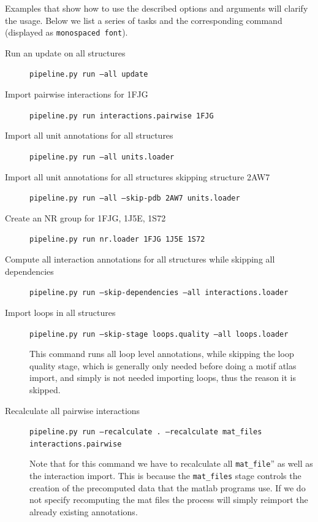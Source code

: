 Examples that show how to use the described options and arguments will clarify
the usage. Below we list a series of tasks and the corresponding command
(displayed as {\tt monospaced font}).

\begin{description}
        \item [Run an update on all structures]
                {\tt pipeline.py run --all update}

        \item [Import pairwise interactions for 1FJG]
                {\tt pipeline.py run interactions.pairwise 1FJG}

        \item [Import all unit annotations for all structures]
                {\tt pipeline.py run --all units.loader}

        \item [Import all unit annotations for all structures skipping structure 2AW7]
                {\tt pipeline.py run --all --skip-pdb 2AW7 units.loader}

        \item [Create an NR group for 1FJG, 1J5E, 1S72]
                {\tt pipeline.py run nr.loader 1FJG 1J5E 1S72}

        \item [Compute all interaction annotations for all structures while skipping all dependencies]
                {\tt pipeline.py run --skip-dependencies --all interactions.loader}

        \item [Import loops in all structures]
                {\tt pipeline.py run --skip-stage loops.quality --all loops.loader}

                This command runs all loop level annotations, while skipping the loop quality stage,
                which is generally only needed before doing a motif atlas import, and simply is not
                needed importing loops, thus the reason it is skipped.

        \item [Recalculate all pairwise interactions]
                {\tt pipeline.py run --recalculate . --recalculate mat\_files interactions.pairwise}

                Note that for this command we have to recalculate all
                {\tt mat\_file}'' as well as the interaction import. This is
                because the {\tt mat\_files} stage controls the creation of the
                precomputed data that the matlab programs use. If we do not
                specify recomputing the mat files the process will simply
                reimport the already existing annotations.



\end{description}
